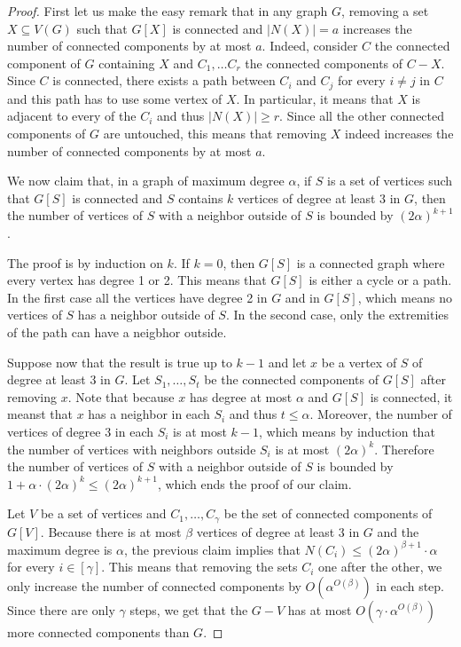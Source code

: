 \documentclass[a4paper,11pt]{article}
\numberwithin{lemma}{section}
\begin{document}
\begin{proof}
 First let us make the easy remark that in any graph $G$, removing a set $X \subseteq V(G)$ such that $G[X]$ is connected and $|N(X)| = a$ increases the number of connected components by at most $a$.
 Indeed, consider $C$ the connected component of $G$ containing $X$ and $C_1, \dots C_r$ the connected components of $C - X$.
 Since $C$ is connected, there exists a path between $C_i$ and $C_j$ for every $i \neq j$ in $C$ and this path has to use some vertex of $X$.
 In particular, it means that $X$ is adjacent to every of the $C_i$ and thus $|N(X)| \geq r$.
 Since all the other connected components of $G$ are untouched, this means that removing $X$ indeed increases the number of connected components by at most $a$.

 We now claim that, in a graph of maximum degree $\alpha$, if $S$ is a set of vertices such that $G[S]$ is connected and $S$ contains $k$ vertices of degree at least $3$ in $G$, then the number of vertices of $S$ with a neighbor outside of $S$ is bounded by $(2 \alpha)^{k+1}$.
    
 The proof is by induction on $k$. If $k = 0$, then $G[S]$ is a connected graph where every vertex has degree 1 or 2.
 This means that $G[S]$ is either a cycle or a path.
 In the first case all the vertices have degree 2 in $G$ and in $G[S]$, which means no vertices of $S$ has a neighbor outside of $S$.
 In the second case, only the extremities of the path can have a neigbhor outside.

 Suppose now that the result is true up to $k-1$ and let $x$ be a vertex of $S$ of degree at least 3 in $G$.
 Let $S_1, \dots, S_t$ be the connected components of $G[S]$ after removing $x$.
 Note that because $x$ has degree at most $\alpha$ and $G[S]$ is connected, it meanst that $x$ has a neighbor in each $S_i$ and thus $t \leq \alpha$.
 Moreover, the number of vertices of degree $3$ in each $S_i$ is at most $k-1$, which means by induction that the number of vertices with neighbors outside $S_i$ is at most $(2 \alpha)^{k} $.
 Therefore the number of vertices of $S$ with a neighbor outside of $S$ is bounded by $1 + \alpha \cdot (2 \alpha)^{k} \leq (2 \alpha)^{k+1} $, which ends the proof of our claim.

 Let $V$ be a set of vertices and $C_1,\dots,C_{\gamma}$ be the set of connected components of $G[V]$.
 Because there is at most $\beta$ vertices of degree at least 3 in $G$ and the maximum degree is $\alpha$, the previous claim implies that $N(C_i) \leq (2 \alpha)^{\beta+1} \cdot \alpha $ for every $i \in [\gamma]$.
 This means that removing the sets $C_i$ one after the other, we only increase the number of connected components by $O(\alpha^{O(\beta)})$ in each step.
 Since there are only $\gamma$ steps, we get that the $G-V$ has at most $O( \gamma \cdot \alpha^{O(\beta)})$ more connected components than $G$.
\end{proof}
 
\end{document}

